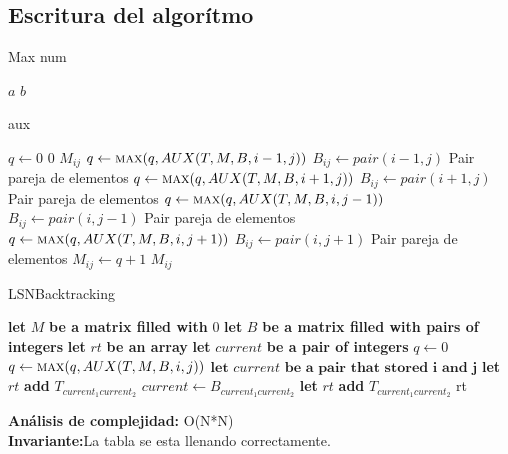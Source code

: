 \documentclass[letter]{article}
\begin{document}
\subsection{Escritura del algor\'itmo}
\begin{algorithm}[!htb]
	\caption{Max num}
	\begin{algorithmic}[1]
		\State \Return $a$
		\Else
		\State \Return $b$
		\EndIf
		\EndFunction
	\end{algorithmic}
\end{algorithm}
\begin{algorithm}[!htb]
	\caption{aux}
	\begin{algorithmic}[1]
		\State $q \gets 0$
		\State \Return $0$
		\State \Return $M_{ij}$
		\Else
		\State $q \gets \Call{max}{q,AUX(T,M,B,i-1,j)}$
		\State $B_{ij} \gets pair(i-1,j)$ \Comment Pair pareja de elementos
		\EndIf
		\EndIf
		\State $q \gets \Call{max}{q,AUX(T,M,B,i+1,j)}$
		\State $B_{ij} \gets pair(i+1,j)$ \Comment Pair pareja de elementos
		\EndIf
		\EndIf
		\State $q \gets \Call{max}{q,AUX(T,M,B,i,j-1)}$
		\State $B_{ij} \gets pair(i,j-1)$ \Comment Pair pareja de elementos
		\EndIf
		\EndIf
		\State $q \gets \Call{max}{q,AUX(T,M,B,i,j+1)}$
		\State $B_{ij} \gets pair(i,j+1)$ \Comment Pair pareja de elementos
		\EndIf
		\EndIf
		\State $M_{ij} \gets q + 1 $
		\EndIf
		\State \Return $M_{ij}$
		\EndProcedure
	\end{algorithmic}
\end{algorithm}
\begin{algorithm}
	\caption{LSNBacktracking}
	\begin{algorithmic}[1]
		\State \textbf{let }$M$ \textbf{ be a matrix filled with } $0$
		\State \textbf{let }$B$ \textbf{ be a matrix filled with pairs of integers}
		\State \textbf{let }$rt$ \textbf{ be an array}
		\State \textbf{let }$current$ \textbf{ be a pair of integers}
		\State $q \gets 0$
		\State $q \gets \Call{max}{q,AUX(T,M,B,i,j)}$
		\State $\textbf{let }current \textbf{ be a pair that stored i and j}$
		\EndIf
		\EndFor
		\EndFor
		\State \textbf{let } $rt$ \textbf{ add  } $T_{current_1current_2}$
		\State $current \gets B_{current_1current_2}$
		\EndWhile
		\State \textbf{let } $rt$ \textbf{ add  } $T_{current_1current_2}$
		\State \Return rt
		\EndProcedure
	\end{algorithmic}
\end{algorithm}
\textbf{An\'alisis de complejidad:}
O(N*N)\\
\textbf{Invariante:}La tabla se esta llenando correctamente.
\end{document}
